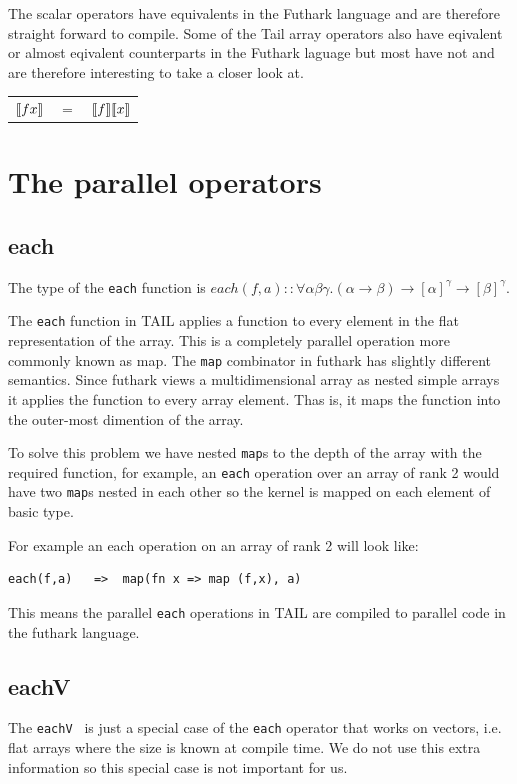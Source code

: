 \documentclass[11pt]{article}
\begin{document}
The scalar operators have equivalents in the Futhark language and are therefore straight forward to compile. Some of the Tail array operators also have eqivalent or almost eqivalent counterparts in the Futhark laguage but most have not and are therefore interesting to take a closer look at.


\begin{tabular}{l c l}
$\llbracket f x \rrbracket$ & $=$ & $\llbracket f \rrbracket \llbracket x \rrbracket$
\end{tabular}

\section{The parallel operators}

\subsection{each}

The type of the {\tt each} function is $each(f,a) :: \forall\alpha\beta\gamma.(\alpha \to \beta) \to [\alpha]^\gamma \to [\beta]^\gamma$.

The {\tt each} function in TAIL applies a function to every element in the flat representation of the array. This is a completely parallel operation more commonly known as map. The {\tt map} combinator in futhark has slightly different semantics.
Since futhark views a multidimensional array as nested simple arrays it applies the function to every array element.
Thas is, it maps the function into the outer-most dimention of the array.

To solve this problem we have nested {\tt map}s to the depth of the array with the required function, for example, an {\tt each} operation over an array of rank 2 would have two {\tt map}s nested in each other so the kernel is mapped on each element of basic type.

For example an each operation on an array of rank 2 will look like:
\begin{lstlisting}[numbers=none,frame=none]
each(f,a)	=>	map(fn x => map (f,x), a)
\end{lstlisting}

This means the parallel {\tt each} operations in TAIL are compiled to parallel code in the futhark language.

\subsection{eachV}
The {\tt eachV } is just a special case of the {\tt each} operator that works on vectors, i.e. flat arrays where the size
is known at compile time. We do not use this extra information so this special case is not important for us.
\end{document}
